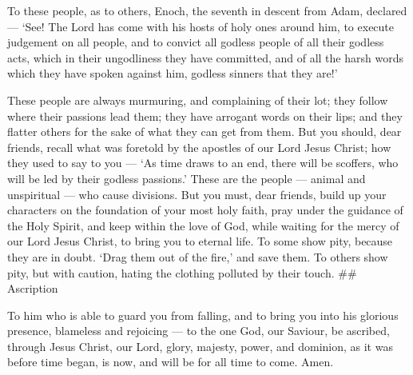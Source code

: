  To these people, as to others, Enoch, the seventh in
descent from Adam, declared --- `See! The Lord has come with his hosts
of holy ones around him,  to execute judgement on all
people, and to convict all godless people of all their godless acts,
which in their ungodliness they have committed, and of all the harsh
words which they have spoken against him, godless sinners that they
are!'

 These people are always murmuring, and complaining of
their lot; they follow where their passions lead them; they have
arrogant words on their lips; and they flatter others for the sake of
what they can get from them.  But you should, dear friends,
recall what was foretold by the apostles of our Lord Jesus Christ;
 how they used to say to you --- `As time draws to an end,
there will be scoffers, who will be led by their godless passions.'
 These are the people --- animal and unspiritual --- who
cause divisions.  But you must, dear friends, build up your
characters on the foundation of your most holy faith, pray under the
guidance of the Holy Spirit,  and keep within the love of
God, while waiting for the mercy of our Lord Jesus Christ, to bring you
to eternal life.  To some show pity, because they are in
doubt. `Drag them out of the fire,' and save them.  To
others show pity, but with caution, hating the clothing polluted by
their touch. \#\# Ascription

 To him who is able to guard you from falling, and to bring
you into his glorious presence, blameless and rejoicing ---
 to the one God, our Saviour, be ascribed, through Jesus
Christ, our Lord, glory, majesty, power, and dominion, as it was before
time began, is now, and will be for all time to come. Amen.
